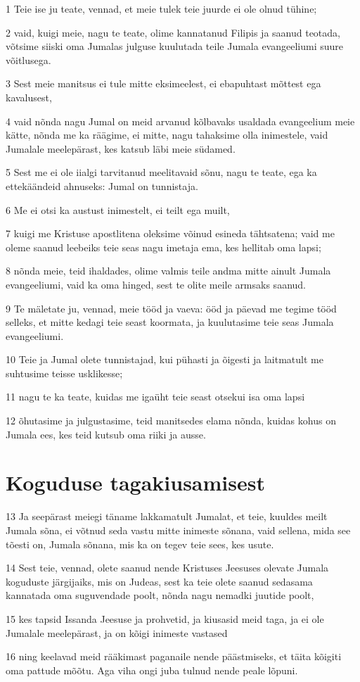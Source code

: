 \par 1 Teie ise ju teate, vennad, et meie tulek teie juurde ei ole olnud tühine;
\par 2 vaid, kuigi meie, nagu te teate, olime kannatanud Filipis ja saanud teotada, võtsime siiski oma Jumalas julguse kuulutada teile Jumala evangeeliumi suure võitlusega.
\par 3 Sest meie manitsus ei tule mitte eksimeelest, ei ebapuhtast mõttest ega kavalusest,
\par 4 vaid nõnda nagu Jumal on meid arvanud kõlbavaks usaldada evangeelium meie kätte, nõnda me ka räägime, ei mitte, nagu tahaksime olla inimestele, vaid Jumalale meelepärast, kes katsub läbi meie südamed.
\par 5 Sest me ei ole iialgi tarvitanud meelitavaid sõnu, nagu te teate, ega ka ettekäändeid ahnuseks: Jumal on tunnistaja.
\par 6 Me ei otsi ka austust inimestelt, ei teilt ega muilt,
\par 7 kuigi me Kristuse apostlitena oleksime võinud esineda tähtsatena; vaid me oleme saanud leebeiks teie seas nagu imetaja ema, kes hellitab oma lapsi;
\par 8 nõnda meie, teid ihaldades, olime valmis teile andma mitte ainult Jumala evangeeliumi, vaid ka oma hinged, sest te olite meile armsaks saanud.
\par 9 Te mäletate ju, vennad, meie tööd ja vaeva: ööd ja päevad me tegime tööd selleks, et mitte kedagi teie seast koormata, ja kuulutasime teie seas Jumala evangeeliumi.
\par 10 Teie ja Jumal olete tunnistajad, kui pühasti ja õigesti ja laitmatult me suhtusime teisse usklikesse;
\par 11 nagu te ka teate, kuidas me igaüht teie seast otsekui isa oma lapsi
\par 12 õhutasime ja julgustasime, teid manitsedes elama nõnda, kuidas kohus on Jumala ees, kes teid kutsub oma riiki ja ausse.

\section*{Koguduse tagakiusamisest}

\par 13 Ja seepärast meiegi täname lakkamatult Jumalat, et teie, kuuldes meilt Jumala sõna, ei võtnud seda vastu mitte inimeste sõnana, vaid sellena, mida see tõesti on, Jumala sõnana, mis ka on tegev teie sees, kes usute.
\par 14 Sest teie, vennad, olete saanud nende Kristuses Jeesuses olevate Jumala koguduste järgijaiks, mis on Judeas, sest ka teie olete saanud sedasama kannatada oma suguvendade poolt, nõnda nagu nemadki juutide poolt,
\par 15 kes tapsid Issanda Jeesuse ja prohvetid, ja kiusasid meid taga, ja ei ole Jumalale meelepärast, ja on kõigi inimeste vastased
\par 16 ning keelavad meid rääkimast paganaile nende päästmiseks, et täita kõigiti oma pattude mõõtu. Aga viha ongi juba tulnud nende peale lõpuni.

